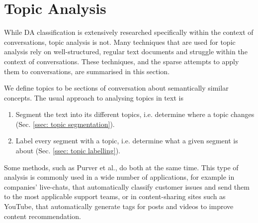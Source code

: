 \section{Topic Analysis \label{sec: topic analysis}}

While DA classification is extensively researched specifically within the context of conversations, topic analysis is not. Many techniques that are used for topic analysis rely on well-structured, regular text documents and struggle within the context of conversations. These techniques, and the sparse attempts to apply them to conversations, are summarised in this section.

We define topics to be sections of conversation about semantically similar concepts.
The usual approach to analysing topics in text is
\begin{enumerate}
    \item Segment the text into its different topics, i.e. determine where a topic changes (Sec. \ref{ssec: topic segmentation}).
    \item Label every segment with a topic, i.e. determine what a given segment is about (Sec. \ref{ssec: topic labelling}).
\end{enumerate}
Some methods, such as Purver et al.\cite{purver2006unsupervised}, do both at the same time.
This type of analysis is commonly used in a wide number of applications, for example in companies' live-chats, that automatically classify customer issues and send them to the most applicable support teams, or in content-sharing sites such as YouTube, that automatically generate tags for posts and videos to improve content recommendation. 



